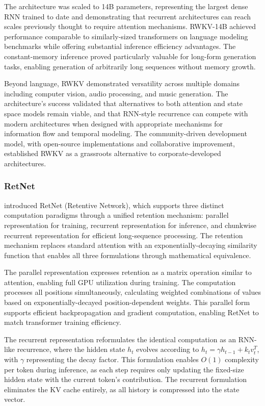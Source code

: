 \documentclass[11pt,letterpaper]{article}
\begin{document}
The architecture was scaled to 14B parameters, representing the largest dense RNN trained to date and demonstrating that recurrent architectures can reach scales previously thought to require attention mechanisms. RWKV-14B achieved performance comparable to similarly-sized transformers on language modeling benchmarks while offering substantial inference efficiency advantages. The constant-memory inference proved particularly valuable for long-form generation tasks, enabling generation of arbitrarily long sequences without memory growth.

Beyond language, RWKV demonstrated versatility across multiple domains including computer vision, audio processing, and music generation. The architecture's success validated that alternatives to both attention and state space models remain viable, and that RNN-style recurrence can compete with modern architectures when designed with appropriate mechanisms for information flow and temporal modeling. The community-driven development model, with open-source implementations and collaborative improvement, established RWKV as a grassroots alternative to corporate-developed architectures.

\subsubsection{RetNet}

\cite{sun2023retentive} introduced RetNet (Retentive Network), which supports three distinct computation paradigms through a unified retention mechanism: parallel representation for training, recurrent representation for inference, and chunkwise recurrent representation for efficient long-sequence processing. The retention mechanism replaces standard attention with an exponentially-decaying similarity function that enables all three formulations through mathematical equivalence.

The parallel representation expresses retention as a matrix operation similar to attention, enabling full GPU utilization during training. The computation processes all positions simultaneously, calculating weighted combinations of values based on exponentially-decayed position-dependent weights. This parallel form supports efficient backpropagation and gradient computation, enabling RetNet to match transformer training efficiency.

The recurrent representation reformulates the identical computation as an RNN-like recurrence, where the hidden state $h_t$ evolves according to $h_t = \gamma h_{t-1} + k_t v_t^T$, with $\gamma$ representing the decay factor. This formulation enables $O(1)$ complexity per token during inference, as each step requires only updating the fixed-size hidden state with the current token's contribution. The recurrent formulation eliminates the KV cache entirely, as all history is compressed into the state vector.
\end{document}

